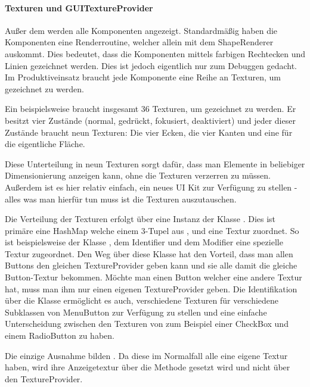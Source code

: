 \paragraph{Texturen und GUITextureProvider}

Außer dem  werden alle Komponenten angezeigt. Standardmäßig haben die Komponenten eine Renderroutine, welcher allein mit dem ShapeRenderer auskommt. Dies bedeutet, dass die Komponenten mittels farbigen Rechtecken und Linien gezeichnet werden. Dies ist jedoch eigentlich nur zum Debuggen gedacht. Im Produktiveinsatz braucht jede Komponente eine Reihe an Texturen, um gezeichnet zu werden.

Ein  beispielsweise braucht insgesamt 36 Texturen, um gezeichnet zu werden. Er besitzt vier Zustände (normal, gedrückt, fokusiert, deaktiviert) und jeder dieser Zustände braucht neun Texturen: Die vier Ecken, die vier Kanten und eine für die eigentliche Fläche.


Diese Unterteilung in neun Texturen sorgt dafür, dass man Elemente in beliebiger Dimensionierung anzeigen kann, ohne die Texturen verzerren zu müssen. Außerdem ist es hier relativ einfach, ein neues UI Kit zur Verfügung zu stellen - alles was man hierfür tun muss ist die Texturen auszutauschen.

Die Verteilung der Texturen erfolgt über eine Instanz der Klasse . Dies ist primäre eine HashMap welche einem 3-Tupel aus ,  und  eine Textur zuordnet. So ist beispielsweise der Klasse , dem Identifier  und dem Modifier  eine spezielle Textur zugeordnet.
Den Weg über diese Klasse hat den Vorteil, dass man allen Buttons den gleichen TextureProvider geben kann und sie alle damit die gleiche Button-Textur bekommen. Möchte man einen Button welcher eine andere Textur hat, muss man ihm nur einen eigenen TextureProvider geben. Die Identifikation über die Klasse ermöglicht es auch, verschiedene Texturen für verschiedene Subklassen von MenuButton zur Verfügung zu stellen und eine einfache Unterscheidung zwischen den Texturen von zum Beispiel einer CheckBox und einem RadioButton zu haben.

Die einzige Ausnahme bilden . Da diese im Normalfall alle eine eigene Textur haben, wird ihre Anzeigetextur über die Methode  gesetzt wird und nicht über den TextureProvider.

